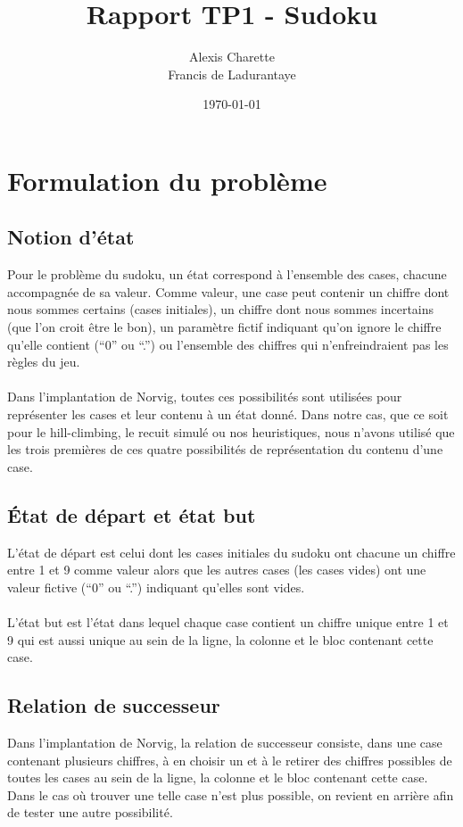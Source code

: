 \documentclass[12pt]{article}
\title{Rapport TP1 - Sudoku}
\author{
  Alexis Charette \\
  Francis de Ladurantaye
}
\date{\today}
\begin{document}
\maketitle
\newpage


\section{Formulation du problème}

\subsection{Notion d'état}
Pour le problème du sudoku, un état correspond à l'ensemble des cases, chacune accompagnée de sa valeur. Comme valeur, une case peut contenir un chiffre dont nous sommes certains (cases initiales), un chiffre dont nous sommes incertains (que l'on croit être le bon), un paramètre fictif indiquant qu'on ignore le chiffre qu'elle contient (``0'' ou ``.'') ou l'ensemble des chiffres qui n'enfreindraient pas les règles du jeu.
\paragraph{}
Dans l'implantation de Norvig, toutes ces possibilités sont utilisées pour représenter les cases et leur contenu à un état donné. Dans notre cas, que ce soit pour le hill-climbing, le recuit simulé ou nos heuristiques, nous n'avons utilisé que les trois premières de ces quatre possibilités de représentation du contenu d'une case.

\subsection{État de départ et état but}
L'état de départ est celui dont les cases initiales du sudoku ont chacune un chiffre entre 1 et 9 comme valeur alors que les autres cases (les cases vides) ont une valeur fictive (``0'' ou ``.'') indiquant qu'elles sont vides.
\paragraph{}
L'état but est l'état dans lequel chaque case contient un chiffre unique entre 1 et 9 qui est aussi unique au sein de la ligne, la colonne et le bloc contenant cette case.

\subsection{Relation de successeur}
Dans l'implantation de Norvig, la relation de successeur consiste, dans une case contenant plusieurs chiffres, à en choisir un et à le retirer des chiffres possibles de toutes les cases au sein de la ligne, la colonne et le bloc contenant cette case. Dans le cas où trouver une telle case n'est plus possible, on revient en arrière afin de tester une autre possibilité.
\end{document}

